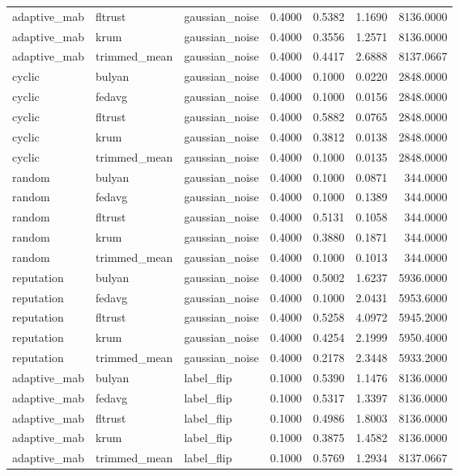 \begin{tabular}{lllrrrr}
adaptive_mab & fltrust & gaussian_noise & 0.4000 & 0.5382 & 1.1690 & 8136.0000 \\
adaptive_mab & krum & gaussian_noise & 0.4000 & 0.3556 & 1.2571 & 8136.0000 \\
adaptive_mab & trimmed_mean & gaussian_noise & 0.4000 & 0.4417 & 2.6888 & 8137.0667 \\
cyclic & bulyan & gaussian_noise & 0.4000 & 0.1000 & 0.0220 & 2848.0000 \\
cyclic & fedavg & gaussian_noise & 0.4000 & 0.1000 & 0.0156 & 2848.0000 \\
cyclic & fltrust & gaussian_noise & 0.4000 & 0.5882 & 0.0765 & 2848.0000 \\
cyclic & krum & gaussian_noise & 0.4000 & 0.3812 & 0.0138 & 2848.0000 \\
cyclic & trimmed_mean & gaussian_noise & 0.4000 & 0.1000 & 0.0135 & 2848.0000 \\
random & bulyan & gaussian_noise & 0.4000 & 0.1000 & 0.0871 & 344.0000 \\
random & fedavg & gaussian_noise & 0.4000 & 0.1000 & 0.1389 & 344.0000 \\
random & fltrust & gaussian_noise & 0.4000 & 0.5131 & 0.1058 & 344.0000 \\
random & krum & gaussian_noise & 0.4000 & 0.3880 & 0.1871 & 344.0000 \\
random & trimmed_mean & gaussian_noise & 0.4000 & 0.1000 & 0.1013 & 344.0000 \\
reputation & bulyan & gaussian_noise & 0.4000 & 0.5002 & 1.6237 & 5936.0000 \\
reputation & fedavg & gaussian_noise & 0.4000 & 0.1000 & 2.0431 & 5953.6000 \\
reputation & fltrust & gaussian_noise & 0.4000 & 0.5258 & 4.0972 & 5945.2000 \\
reputation & krum & gaussian_noise & 0.4000 & 0.4254 & 2.1999 & 5950.4000 \\
reputation & trimmed_mean & gaussian_noise & 0.4000 & 0.2178 & 2.3448 & 5933.2000 \\
adaptive_mab & bulyan & label_flip & 0.1000 & 0.5390 & 1.1476 & 8136.0000 \\
adaptive_mab & fedavg & label_flip & 0.1000 & 0.5317 & 1.3397 & 8136.0000 \\
adaptive_mab & fltrust & label_flip & 0.1000 & 0.4986 & 1.8003 & 8136.0000 \\
adaptive_mab & krum & label_flip & 0.1000 & 0.3875 & 1.4582 & 8136.0000 \\
adaptive_mab & trimmed_mean & label_flip & 0.1000 & 0.5769 & 1.2934 & 8137.0667 \\

\end{tabular}

